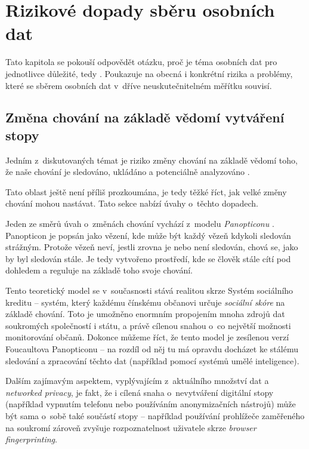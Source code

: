 \chapter{Rizikové dopady sběru osobních dat}

Tato kapitola se pokouší odpovědět otázku, proč je téma osobních dat pro jednotlivce důležité, tedy . Poukazuje na obecná i konkrétní rizika a problémy, které se sběrem osobních dat v~dříve neuskutečnitelném měřítku souvisí. 


\section{Změna chování na základě vědomí vytváření stopy}

Jedním z~diskutovaných témat je riziko změny chování na základě vědomí toho, že naše chování je sledováno, ukládáno a potenciálně analyzováno \citep{behavior-changes}.

Tato oblast ještě není příliš prozkoumána, je tedy těžké říct, jak velké změny chování mohou nastávat. Tato sekce nabízí úvahy o~těchto dopadech.

Jeden ze směrů úvah o~změnách chování vychází z~modelu \textit{Panopticonu} \citep{panopticon}. Panopticon je popsán jako vězení, kde může být každý vězeň kdykoli sledován strážným. Protože vězeň neví, jestli zrovna je nebo není sledován, chová se, jako by byl sledován stále. Je tedy vytvořeno prostředí, kde se člověk stále cítí pod dohledem a reguluje na základě toho svoje chování.

Tento teoretický model se v~současnosti stává realitou skrze Systém sociálního kreditu -- systém, který každému čínskému občanovi určuje \textit{sociální skóre} na základě chování. Toto je umožněno enormním propojením mnoha zdrojů dat soukromých společností i státu, a právě cílenou snahou o~co největší možnosti monitorování občanů. Dokonce můžeme říct, že tento model je zesílenou verzí Foucaultova Panopticonu -- na rozdíl od něj tu má opravdu docházet ke stálému sledování a zpracování těchto dat (například pomocí systémů umělé inteligence).

Dalším zajímavým aspektem, vyplývajícím z~aktuálního množství dat a \textit{networked privacy}, je fakt, že i cílená snaha o~nevytváření digitální stopy (například vypnutím telefonu nebo používáním anonymizačních nástrojů) může být sama o~sobě také součástí stopy -- například používání prohlížeče zaměřeného na soukromí zároveň zvyšuje rozpoznatelnost uživatele skrze \textit{browser fingerprinting}.

